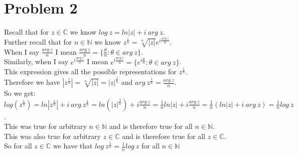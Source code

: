 \documentclass{article}
\begin{document}
\section*{Problem 2}
\begin{center}
    \doublespacing
    Recall that for $z\in\mathbb{C}$ we know $log\:z = ln|z| + i\:arg\:z$.
    \\Further recall that for $n\in\mathbb{N}$ we know $z^{\frac{1}{n}} =\sqrt[n]{|z|} e^{i\frac{arg\:z}{n}}$.
    \\When I say $\frac{arg\:z}{n}$ I mean $\frac{arg\:z}{n} =\{\frac{\theta}{n}:\theta\in arg\:z\}$.
    \\Similarly, when I say $e^{i\frac{arg\:z}{n}}$ I mean $e^{i\frac{arg\:z}{n}} =\{e^{i\frac{\theta}{n}}:\theta\in arg\:z\}$.
    \\This expression gives all the possible representations for $z^\frac{1}{n}$.
    \break
    \\Therefore we have $|z^{\frac{1}{n}}| =\sqrt[n]{|z|} = |z|^{\frac{1}{n}}$ and $arg\:z^{\frac{1}{n}} =\frac{arg\:z}{n}$.
    \\So we get:
    \\$log(z^{\frac{1}{n}}) = ln|z^{\frac{1}{n}}| + i\:arg\:z^{\frac{1}{n}} = ln(|z|^{\frac{1}{n}}) + i\frac{arg\:z}{n} =\frac{1}{n} ln|z| + i\frac{arg\:z}{n} =\frac{1}{n} (ln|z| + i\:arg\:z) =\frac{1}{n} log\:z$.
    \\This was true for arbitrary $n\in\mathbb{N}$ and is therefore true for all $n\in\mathbb{N}$.
    \\This was also true for arbitrary $z\in\mathbb{C}$ and is therefore true for all $z\in\mathbb{C}$.
    \\So for all $z\in\mathbb{C}$ we have that $log\:z^{\frac{1}{n}} =\frac{1}{n} log\:z$ for all $n\in\mathbb{N}$ \qedsymbol
\end{center}
\end{document}
